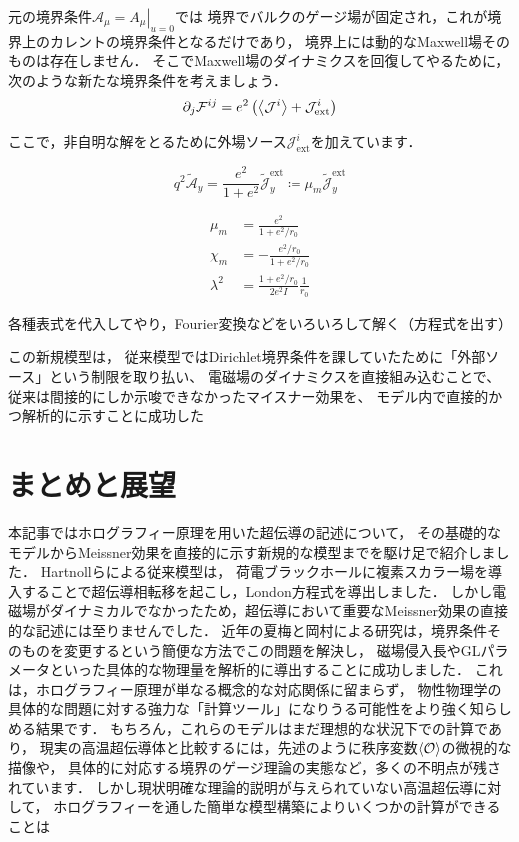\documentclass[b5paper,11pt,dvipdfmx]{jsarticle}
\numberwithin{equation}{section}
\theoremstyle{definition}
\begin{document}
元の境界条件$\mathcal{A}_\mu = \left. A_\mu \right|_{u = 0}$では
境界でバルクのゲージ場が固定され，これが境界上のカレントの境界条件となるだけであり，
境界上には動的なMaxwell場そのものは存在しません．
そこでMaxwell場のダイナミクスを回復してやるために，次のような新たな境界条件を考えましょう．
\begin{equation}
    \partial_{j} \mathcal{F}^{ij}
    = e^{2} \left( \ev{\mathcal{J}^{i}} + \mathcal{J}_{\text{ext}}^i \right)
\end{equation}

ここで，非自明な解をとるために外場ソース$\mathcal{J}_{\text{ext}}^i$を加えています．

\begin{equation}
    q^2 \tilde{\mathcal{A}}_y
    = \frac{e^2}{1 + e^2} \tilde{\mathcal{J}}^{\text{ext}}_y
    \coloneq \mu_m \tilde{\mathcal{J}}^{\text{ext}}_y
\end{equation}

\begin{equation}
    \begin{split}
            \mu_m
            &= \frac{e^2}{1 + e^2 / r_0}\\
            \chi_m
            &= - \frac{e^2 / r_0}{1 + e^2 / r_0}\\
            \lambda^2
            &= \frac{1 + e^2 / r_0}{2 e^2 I}\frac{1}{r_0}
    \end{split}
\end{equation}


各種表式を代入してやり，Fourier変換などをいろいろして解く（方程式を出す）



この新規模型は，
従来模型ではDirichlet境界条件を課していたために「外部ソース」という制限を取り払い、
電磁場のダイナミクスを直接組み込むことで、従来は間接的にしか示唆できなかったマイスナー効果を、
モデル内で直接的かつ解析的に示すことに成功した




\section{まとめと展望}
本記事ではホログラフィー原理を用いた超伝導の記述について，
その基礎的なモデルからMeissner効果を直接的に示す新規的な模型までを駆け足で紹介しました．
Hartnollらによる従来模型は，
荷電ブラックホールに複素スカラー場を導入することで超伝導相転移を起こし，London方程式を導出しました．
しかし電磁場がダイナミカルでなかったため，超伝導において重要なMeissner効果の直接的な記述には至りませんでした．
近年の夏梅と岡村による研究は，境界条件そのものを変更するという簡便な方法でこの問題を解決し，
磁場侵入長やGLパラメータといった具体的な物理量を解析的に導出することに成功しました．
これは，ホログラフィー原理が単なる概念的な対応関係に留まらず，
物性物理学の具体的な問題に対する強力な「計算ツール」になりうる可能性をより強く知らしめる結果です．
もちろん，これらのモデルはまだ理想的な状況下での計算であり，
現実の高温超伝導体と比較するには，先述のように秩序変数$\ev{\mathcal{O}}$の微視的な描像や，
具体的に対応する境界のゲージ理論の実態など，多くの不明点が残されています．
しかし現状明確な理論的説明が与えられていない高温超伝導に対して，
ホログラフィーを通した簡単な模型構築によりいくつかの計算ができることは
\end{document}
